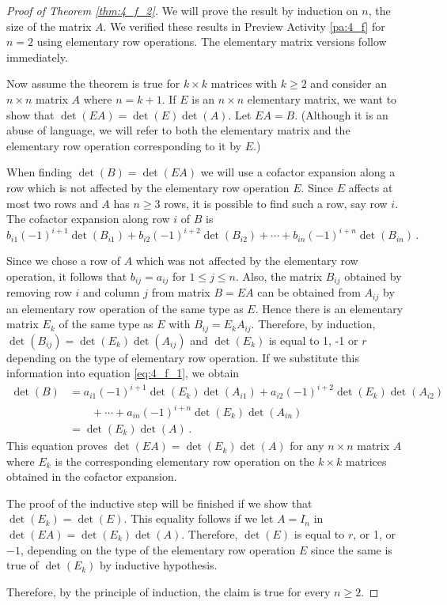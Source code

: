 \begin{proof}[Proof of Theorem \ref{thm:4_f_2}] 
We will prove the result by induction on $n$, the size of the matrix $A$. We verified these results in Preview Activity \ref{pa:4_f} for $n=2$ using elementary row operations. The elementary matrix versions follow immediately.

Now assume the theorem is true for $k\times k$ matrices with $k\geq 2$ and consider an $n\times n$ matrix $A$ where $n=k+1$. If $E$ is an $n\times n$ elementary matrix, we want to show that $\det(EA)=\det(E)\det(A)$. Let $EA=B$. (Although it is an abuse of language, we will refer to both the elementary matrix and the elementary row operation corresponding to it by $E$.)

When finding $\det(B)=\det(EA)$ we will use a cofactor expansion along a row which is not affected by the elementary row operation $E$. Since $E$ affects at most two rows and $A$ has $n\geq 3$ rows, it is possible to find such a row, say row $i$. The cofactor expansion along row $i$ of $B$ is 
\begin{equation}\label{eq:4_f_1}
b_{i1} (-1)^{i+1} \det(B_{i1}) + b_{i2} (-1)^{i+2} \det(B_{i2}) + \cdots + b_{in} (-1)^{i+n} \det(B_{in}) \, . 
\end{equation}

Since we chose a row of $A$ which was not affected by the elementary row operation, it follows that $b_{ij}=a_{ij}$ for $1\leq j\leq n$. Also, the matrix $B_{ij}$ obtained by removing row $i$ and column $j$ from matrix $B=EA$ can be obtained from $A_{ij}$ by an elementary row operation of the same type as $E$. Hence there is an elementary matrix $E_k$ of the same type as $E$ with $B_{ij}=E_k A_{ij}$. Therefore, by induction, $\det(B_{ij})=\det(E_k)\det(A_{ij})$ and $\det(E_k)$ is equal to 1, -1 or $r$ depending on the type of elementary row operation. If we substitute this information into equation \eqref{eq:4_f_1}, we obtain
\begin{equation*}
\begin{split}
\det(B)&= a_{i1} (-1)^{i+1} \det(E_k) \det(A_{i1}) + a_{i2} (-1)^{i+2} \det(E_k) \det(A_{i2}) \\
	&\qquad + \cdots + a_{in} (-1)^{i+n} \det(E_k) \det(A_{in})\\
	&= \det(E_k) \det(A) \, . 
\end{split}
\end{equation*}
This equation proves $\det(EA)=\det(E_k)\det(A)$ for any $n\times n$ matrix $A$ where $E_k$ is the corresponding elementary row operation on the $k\times k$ matrices obtained in the cofactor expansion.

The proof of the inductive step will be finished if we show that $\det(E_k)=\det(E)$. This equality follows if we let $A=I_n$ in $\det(EA)=\det(E_k)\det(A)$. Therefore, $\det(E)$ is equal to $r$, or 1, or $-1$, depending on the type of the elementary row operation $E$ since the same is true of $\det(E_k)$ by inductive hypothesis.

Therefore, by the principle of induction, the claim is true for every $n\geq 2$.
\end{proof}



